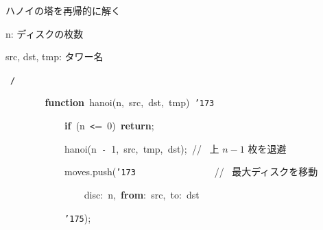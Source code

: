 \documentclass[a4paper,10pt]{article}
\def\mc{\relax}
\begin{document}
\noindent
\mbox{}\rm\mc {\tt\mc \ }{\tt\mc \ }{\tt\mc \ }{\tt\mc \ }{\tt\mc \ }{\tt\mc \ }{\tt\mc \ }{\tt\mc \ }{\tt\mc \ }{\tt *} ハノイの塔を再帰的に解く
\tt\mc 

\noindent
\mbox{}\rm\mc {\tt\mc \ }{\tt\mc \ }{\tt\mc \ }{\tt\mc \ }{\tt\mc \ }{\tt\mc \ }{\tt\mc \ }{\tt\mc \ }{\tt\mc \ }{\tt *} n: ディスクの枚数
\tt\mc 

\noindent
\mbox{}\rm\mc {\tt\mc \ }{\tt\mc \ }{\tt\mc \ }{\tt\mc \ }{\tt\mc \ }{\tt\mc \ }{\tt\mc \ }{\tt\mc \ }{\tt\mc \ }{\tt *} src, dst, tmp: タワー名
\tt\mc 

\noindent
\mbox{}\rm\mc {\tt\mc \ }{\tt\mc \ }{\tt\mc \ }{\tt\mc \ }{\tt\mc \ }{\tt\mc \ }{\tt\mc \ }{\tt\mc \ }{\tt\mc \ }\rm\mc \ {\tt *}{\tt /}
\tt\mc 

\noindent
\mbox{}{\tt\mc \ }{\tt\mc \ }{\tt\mc \ }{\tt\mc \ }{\tt\mc \ }{\tt\mc \ }{\tt\mc \ }{\tt\mc \ }\textbf{function}{\tt\mc \ }hanoi(n,{\tt\mc \ }src,{\tt\mc \ }dst,{\tt\mc \ }tmp){\tt\mc \ }{\tt\char'173}

\noindent
\mbox{}{\tt\mc \ }{\tt\mc \ }{\tt\mc \ }{\tt\mc \ }{\tt\mc \ }{\tt\mc \ }{\tt\mc \ }{\tt\mc \ }{\tt\mc \ }{\tt\mc \ }{\tt\mc \ }{\tt\mc \ }\textbf{if}{\tt\mc \ }(n{\tt\mc \ }{\tt <}={\tt\mc \ }0){\tt\mc \ }\textbf{return};

\noindent
\mbox{}{\tt\mc \ }{\tt\mc \ }{\tt\mc \ }{\tt\mc \ }{\tt\mc \ }{\tt\mc \ }{\tt\mc \ }{\tt\mc \ }{\tt\mc \ }{\tt\mc \ }{\tt\mc \ }{\tt\mc \ }hanoi(n{\tt\mc \ }{\tt -}{\tt\mc \ }1,{\tt\mc \ }src,{\tt\mc \ }tmp,{\tt\mc \ }dst);{\tt\mc \ }\rm\mc // \ 上 $n-1$ 枚を退避 \hfill
\tt\mc 

\noindent
\mbox{}{\tt\mc \ }{\tt\mc \ }{\tt\mc \ }{\tt\mc \ }{\tt\mc \ }{\tt\mc \ }{\tt\mc \ }{\tt\mc \ }{\tt\mc \ }{\tt\mc \ }{\tt\mc \ }{\tt\mc \ }moves.push({\tt\char'173}{\tt\mc \ }{\tt\mc \ }{\tt\mc \ }{\tt\mc \ }{\tt\mc \ }{\tt\mc \ }{\tt\mc \ }{\tt\mc \ }{\tt\mc \ }{\tt\mc \ }{\tt\mc \ }{\tt\mc \ }{\tt\mc \ }{\tt\mc \ }{\tt\mc \ }{\tt\mc \ }\rm\mc // \ 最大ディスクを移動 \hfill
\tt\mc 

\noindent
\mbox{}{\tt\mc \ }{\tt\mc \ }{\tt\mc \ }{\tt\mc \ }{\tt\mc \ }{\tt\mc \ }{\tt\mc \ }{\tt\mc \ }{\tt\mc \ }{\tt\mc \ }{\tt\mc \ }{\tt\mc \ }{\tt\mc \ }{\tt\mc \ }{\tt\mc \ }{\tt\mc \ }disc:{\tt\mc \ }n,{\tt\mc \ }\textbf{from}:{\tt\mc \ }src,{\tt\mc \ }to:{\tt\mc \ }dst

\noindent
\mbox{}{\tt\mc \ }{\tt\mc \ }{\tt\mc \ }{\tt\mc \ }{\tt\mc \ }{\tt\mc \ }{\tt\mc \ }{\tt\mc \ }{\tt\mc \ }{\tt\mc \ }{\tt\mc \ }{\tt\mc \ }{\tt\char'175});
\end{document}
